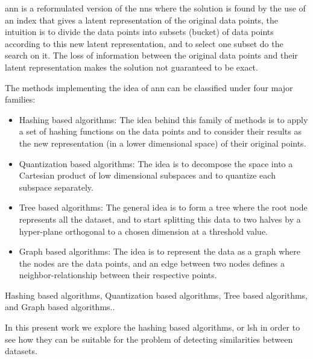 \Acrfull{ann} is a reformulated version of the \Acrlong{nns} where the solution
is found by the use of an index that gives a latent representation of the
original data points, the intuition is to divide the data points into subsets
(\gls{bucket}) of data points according to this new latent representation, and to
select one subset do the search on it. The loss of information between the
original data points and their latent representation makes the solution not
guaranteed to be exact.

The methods implementing the idea of \acrshort{ann} can be classified under four
major families:
\begin{itemize}
      \item Hashing based algorithms: The idea behind this family of methods is
            to apply a set of hashing functions on the data points and to
            consider their results as the new representation (in a lower
            dimensional space) of their original points.
      \item Quantization based algorithms: The idea is to decompose the space
            into a Cartesian product of low dimensional subspaces and to quantize each
            subspace separately. \citep{jegou_pqfnns_2011}
      \item Tree based algorithms: The general idea is to form a tree where the
            root node represents all the dataset, and to start splitting this data to
            two halves by a hyper-plane orthogonal to a chosen dimension at a threshold
            value. \citep{silpanan_2008}
      \item Graph based algorithms: The idea is to represent the data as a graph
            where the nodes are the data points, and an edge between two nodes
            defines a neighbor-relationship between their respective points.
            \citep{ann_mengzaho_2021}
\end{itemize}

Hashing based algorithms, Quantization based algorithms, Tree
based algorithms, and Graph based algorithms.\citep{ann_mengzaho_2021}.

In this present work we explore the hashing based algorithms, or \acrfull{lsh}
in order to see how they can be suitable for the problem of detecting
similarities between datasets.
